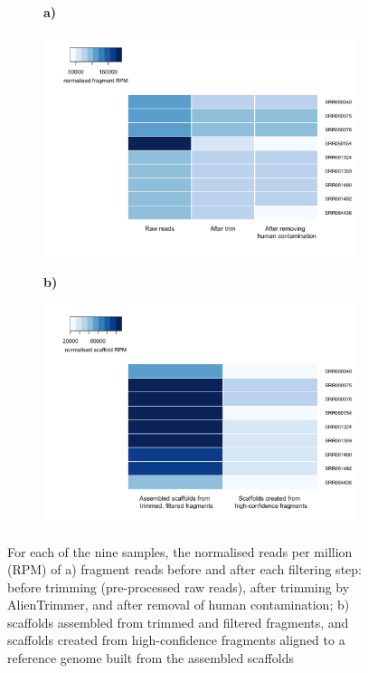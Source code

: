 \documentclass[a4paper]{article}
\begin{document}
\begin{figure}[H]
\centering
\begin{subfigure}[t]{0.03\textwidth}
\textbf{a)}
\end{subfigure}
\begin{subfigure}[t]{0.95\textwidth}
\includegraphics[width=\linewidth,valign=t]{fragment_heatmap-1.png}
\end{subfigure}\hfill
\begin{subfigure}[t]{0.03\textwidth}
\textbf{b)}
\end{subfigure}
\begin{subfigure}[t]{0.95\textwidth}
\includegraphics[width=\linewidth,valign=t]{scaffolds_heatmap-1.png}
\end{subfigure}

\caption{\label{fig:quality control} For each of the nine samples, the normalised reads per million (RPM) of a) fragment reads before and after each filtering step: before trimming (pre-processed raw reads), after trimming by AlienTrimmer, and after removal of human contamination; b) scaffolds assembled from trimmed and filtered fragments, and scaffolds created from high-confidence fragments aligned to a reference genome built from the assembled scaffolds}
\end{figure}
\end{document}

